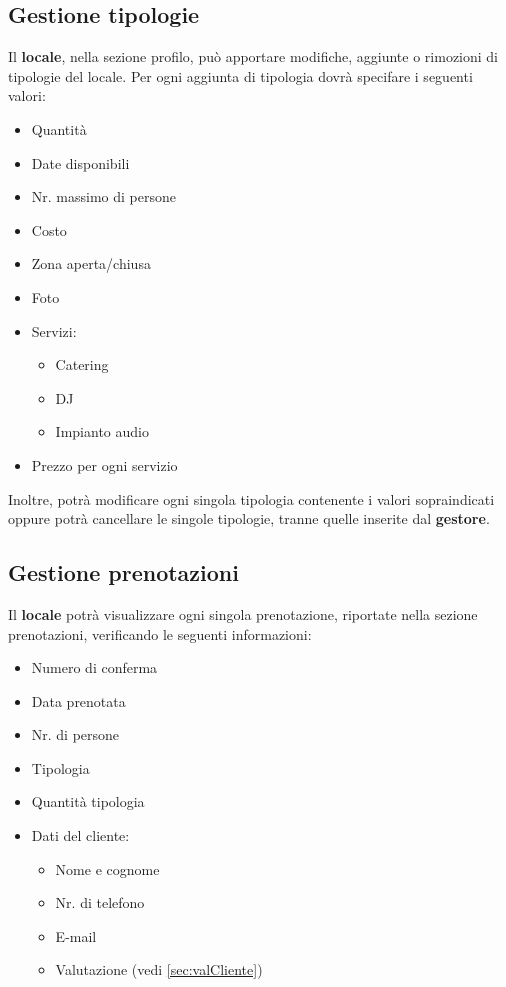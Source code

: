 \subsection{Gestione tipologie} \label{sec:gestTipo}
Il \textbf{locale}, nella sezione profilo, può apportare modifiche, aggiunte o rimozioni di tipologie del locale.
Per ogni aggiunta di tipologia dovrà specifare i seguenti valori:
\begin{itemize}
    \item Quantità
    \item Date disponibili
    \item Nr. massimo di persone
    \item Costo
    \item Zona aperta/chiusa
    \item Foto
    \item Servizi:
    \begin{itemize}
        \item Catering
        \item DJ
        \item Impianto audio
    \end{itemize}
    \item Prezzo per ogni servizio 
    \label{itm:infoLocale}
\end{itemize}
Inoltre, potrà modificare ogni singola tipologia contenente i valori sopraindicati oppure potrà cancellare le singole
tipologie, tranne quelle inserite dal \textbf{gestore}. 

\subsection{Gestione prenotazioni}
Il \textbf{locale} potrà visualizzare ogni singola prenotazione, riportate nella sezione prenotazioni, verificando le
seguenti informazioni:
\begin{itemize}
    \item Numero di conferma
    \item Data prenotata
    \item Nr. di persone
    \item Tipologia
    \item Quantità tipologia
    \item Dati del cliente:
    \begin{itemize}
        \item Nome e cognome
        \item Nr. di telefono
        \item E-mail
        \item Valutazione (vedi \ref{sec:valCliente})
    \end{itemize}
\end{itemize}

